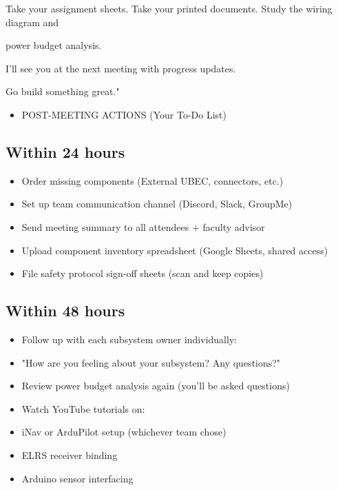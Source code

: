 \documentclass[11pt,letterpaper]{article}
\begin{document}
{Take your assignment sheets. Take your printed documents. Study the wiring diagram and\par

power budget analysis.\par

I'll see you at the next meeting with progress updates.\par

Go build something great."\par

\begin{itemize}
  \item POST-MEETING ACTIONS (Your To-Do List)
\end{itemize}

\subsection{Within 24 hours}

\begin{itemize}
  \item Order missing components (External UBEC, connectors, etc.)
  \item Set up team communication channel (Discord, Slack, GroupMe)
  \item Send meeting summary to all attendees + faculty advisor
  \item Upload component inventory spreadsheet (Google Sheets, shared access)
  \item File safety protocol sign-off sheets (scan and keep copies)
\end{itemize}

\subsection{Within 48 hours}

\begin{itemize}
  \item Follow up with each subsystem owner individually:
  \item "How are you feeling about your subsystem? Any questions?"
  \item Review power budget analysis again (you'll be asked questions)
  \item Watch YouTube tutorials on:
  \item iNav or ArduPilot setup (whichever team chose)
  \item ELRS receiver binding
  \item Arduino sensor interfacing
\end{itemize}

}
\end{document}
